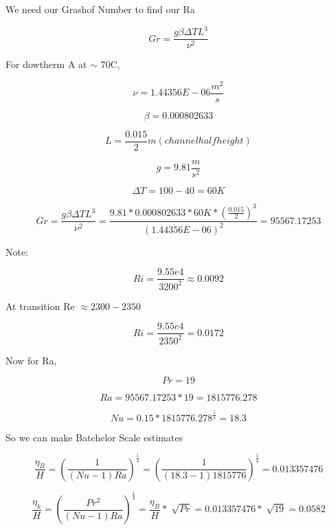\documentclass[12pt]{article}
\renewcommand{\_}{\kern-1.5pt\textunderscore\kern-1.5pt}
\begin{document}
We need our Grashof Number to find our Ra\par

 \[ Gr=\frac{g \beta  \Delta TL^{3}}{ \nu ^{2}} \] \par

For dowtherm A at $ \sim $ 70C,\par

 \[  \nu =1.44356E-06\frac{m^{2}}{s} \] \par

 \[  \beta =0.000802633 \] \par

 \[ L=\frac{0.015}{2} m  \left( channel half height \right)  \] \par

 \[ g=9.81\frac{m}{s^{2}} \] \par

 \[  \Delta T=100-40=60K \] \par

 \[ Gr=\frac{g \beta  \Delta TL^{3}}{ \nu ^{2}}=\frac{9.81\ast0.000802633\ast60K\ast \left( \frac{0.015}{2} \right) ^{3}}{ \left( 1.44356E-06 \right) ^{2}}=95567.17253 \] \par

Note:\par

 \[ Ri=\frac{9.55e4}{3200^{2}} \approx 0.0092 \] \par

At transition Re  \(  \approx 2300-2350 \) \par

 \[ Ri=\frac{9.55e4}{2350^{2}}=0.0172 \] \par

Now for Ra,\par

 \[ Pr=19 \] \par

 \[ Ra=95567.17253\ast19=1815776.278 \] \par

 \[ Nu=0.15\ast1815776.278^{\frac{1}{3}}=18.3 \] \par

So we can make Batchelor Scale estimates\par

 \[ \frac{ \eta _{B}}{H}= \left( \frac{1}{ \left( Nu-1 \right) Ra} \right) ^{\frac{1}{4}}= \left( \frac{1}{ \left( 18.3-1 \right) 1815776} \right) ^{\frac{1}{4}}=0.013357476 \] \par

 \[ \frac{ \eta _{k}}{H}= \left( \frac{Pr^{2}}{ \left( Nu-1 \right) Ra} \right) ^{\frac{1}{4}}=\frac{ \eta _{B}}{H}\ast\sqrt[]{Pr}=0.013357476\ast\sqrt[]{19}=0.0582 \] \par
\end{document}
